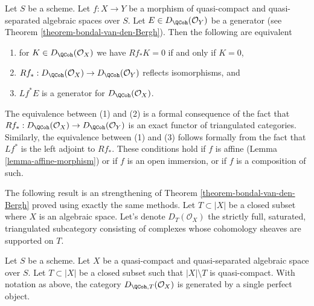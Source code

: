 \begin{remark}
\label{remark-pullback-generator}
Let $S$ be a scheme.
Let $f : X \to Y$ be a morphism of quasi-compact and quasi-separated
algebraic spaces over $S$.
Let $E \in D_\QCoh(\mathcal{O}_Y)$ be a generator
(see Theorem \ref{theorem-bondal-van-den-Bergh}).
Then the following are equivalent
\begin{enumerate}
\item for $K \in D_\QCoh(\mathcal{O}_X)$ we have
$Rf_*K = 0$ if and only if $K = 0$,
\item $Rf_* : D_\QCoh(\mathcal{O}_X) \to D_\QCoh(\mathcal{O}_Y)$
reflects isomorphisms, and
\item $Lf^*E$ is a generator for $D_\QCoh(\mathcal{O}_X)$.
\end{enumerate}
The equivalence between (1) and (2) is a formal consequence of the fact that
$Rf_* : D_\QCoh(\mathcal{O}_X) \to D_\QCoh(\mathcal{O}_Y)$ is an
exact functor of triangulated categories. Similarly, the equivalence
between (1) and (3) follows formally from the fact that $Lf^*$
is the left adjoint to $Rf_*$.
These conditions hold if $f$ is affine (Lemma \ref{lemma-affine-morphism})
or if $f$ is an open immersion, or if $f$ is a composition of such.
\end{remark}

\noindent
The following result is an strengthening of
Theorem \ref{theorem-bondal-van-den-Bergh}
proved using exactly the same methods.
Let $T \subset |X|$ be a closed subset where $X$ is an algebraic space.
Let's denote $D_T(\mathcal{O}_X)$ the strictly full, saturated,
triangulated subcategory consisting of complexes whose
cohomology sheaves are supported on $T$.

\begin{lemma}
\label{lemma-generator-with-support}
Let $S$ be a scheme. Let $X$ be a quasi-compact and quasi-separated
algebraic space over $S$. Let $T \subset |X|$ be a
closed subset such that $|X| \setminus T$ is quasi-compact. With notation
as above, the category $D_{\QCoh, T}(\mathcal{O}_X)$ is generated by a
single perfect object.
\end{lemma}

